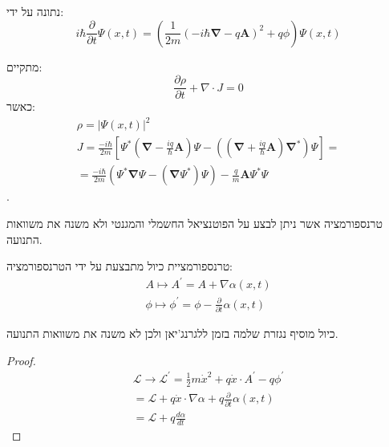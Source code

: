 \documentclass{tstextbook}
\begin{document}
\begin{proposition}
נתונה על ידי:
$$i\hbar{\frac{\partial}{\partial t}}\Psi(x,t)=\left({\frac{1}{2m}}\left(-i\hbar\mathbf{\nabla}-q\mathbf{A}\right)^{2}+q\phi\right)\Psi(x,t)$$

\end{proposition}
\begin{corollary}
מתקיים:
$${\frac{\partial\rho}{\partial t}}+\nabla\cdot J=0$$
כאשר:
\begin{gather*}\rho=|\Psi(x,t)|^{2}\\ J=\frac{-i\hbar}{2m}\left[\Psi^{*}\left(\mathbf{\nabla}-\frac{iq}{\hbar}\mathbf{A}\right)\Psi-\left(\left(\mathbf{\nabla}+\frac{iq}{\hbar}\mathbf{A}\right)\mathbf{\nabla}^{*}\right)\Psi\right]=\\=\frac{-i\hbar}{2m}\left(\Psi^{*}\mathbf{\nabla}\Psi-\left( \mathbf{\nabla}\Psi^{*} \right)\Psi\right)-\frac{q}{m}\mathbf{A}\Psi^{*}\Psi 
\end{gather*}
.

\end{corollary}
\begin{definition}
טרנספורמציה אשר ניתן לבצע על הפוטנציאל החשמלי והמגנטי ולא משנה את משוואות התנועה.

\end{definition}
\begin{proposition}
טרנספורמציית כיול מתבצעת על ידי הטרנספורמציה:
$$\begin{array}{l}{{A\mapsto A^{\prime}=A+\nabla\!\alpha(x,t)}}\\ {{\phi\mapsto\phi^{\prime}=\phi-\frac{\partial}{\partial t}\alpha(x,t)}}\end{array}$$

\end{proposition}
\begin{proposition}
כיול מוסיף נגזרת שלמה בזמן ללגרנג'יאן ולכן לא משנה את משוואות התנועה.

\end{proposition}
\begin{proof}
$$\begin{array}{c}{{{\mathcal{L}}\rightarrow{\mathcal{L}}^{\prime}=\frac{1}{2}m{\dot{x}}^{2}+q{\dot{x}}\cdot A^{\prime}-q\phi^{\prime}}}\\ {{{}={\mathcal{L}}+q{\dot{x}}\cdot\nabla\alpha+q\frac{\partial}{\partial t}\alpha(x,t)}}\\ {{{}={\mathcal{L}}+q\frac{d\alpha}{d t}}}\end{array}$$

\end{proof}
\end{document}
